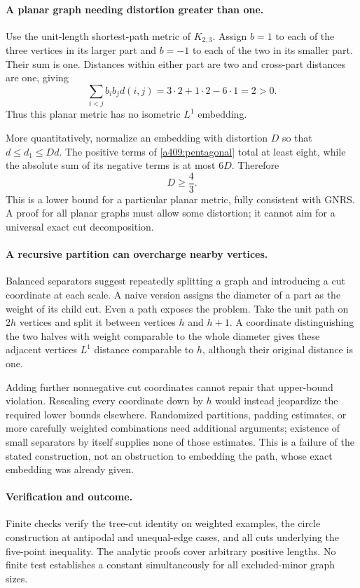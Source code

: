 \documentclass[11pt]{article}
\begin{document}
\paragraph{A planar graph needing distortion greater than one.}
Use the unit-length shortest-path metric of $K_{2,3}$. Assign $b=1$ to each of the three vertices in its larger part and $b=-1$ to each of the two in its smaller part. Their sum is one. Distances within either part are two and cross-part distances are one, giving
\[
 \sum_{i<j}b_ib_jd(i,j)
       =3\cdot2+1\cdot2-6\cdot1=2>0.
\]
Thus this planar metric has no isometric $L^1$ embedding.

More quantitatively, normalize an embedding with distortion $D$ so that
$d\le d_1\le Dd$. The positive terms of \eqref{a409:pentagonal} total at least eight, while the absolute sum of its negative terms is at most $6D$. Therefore
\[
 D\ge\frac43.
\]
This is a lower bound for a particular planar metric, fully consistent with GNRS. A proof for all planar graphs must allow some distortion; it cannot aim for a universal exact cut decomposition.

\paragraph{A recursive partition can overcharge nearby vertices.}
Balanced separators suggest repeatedly splitting a graph and introducing a cut coordinate at each scale. A naive version assigns the diameter of a part as the weight of its child cut. Even a path exposes the problem. Take the unit path on $2h$ vertices and split it between vertices $h$ and $h+1$. A coordinate distinguishing the two halves with weight comparable to the whole diameter gives these adjacent vertices $L^1$ distance comparable to $h$, although their original distance is one.

Adding further nonnegative cut coordinates cannot repair that upper-bound violation. Rescaling every coordinate down by $h$ would instead jeopardize the required lower bounds elsewhere. Randomized partitions, padding estimates, or more carefully weighted combinations need additional arguments; existence of small separators by itself supplies none of those estimates. This is a failure of the stated construction, not an obstruction to embedding the path, whose exact embedding was already given.

\paragraph{Verification and outcome.}
Finite checks verify the tree-cut identity on weighted examples, the circle construction at antipodal and unequal-edge cases, and all cuts underlying the five-point inequality. The analytic proofs cover arbitrary positive lengths. No finite test establishes a constant simultaneously for all excluded-minor graph sizes.
\end{document}
